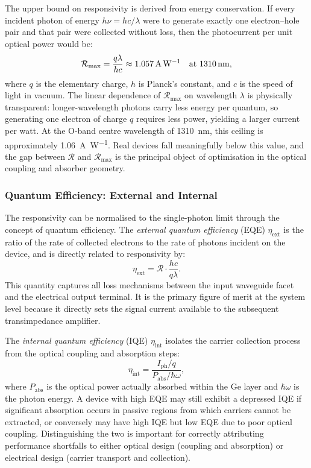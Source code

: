 The upper bound on responsivity is derived from energy conservation. If every
incident photon of energy $h\nu = hc/\lambda$ were to generate exactly one
electron–hole pair and that pair were collected without loss, then the
photocurrent per unit optical power would be:
\begin{equation}
    \mathcal{R}_{\max} = \frac{q\lambda}{hc}
    \approx \SI{1.057}{\ampere\per\watt}
    \quad\text{at \SI{1310}{\nano\metre}},
    \label{eq:rmax}
\end{equation}
where $q$ is the elementary charge, $h$ is Planck's constant, and $c$ is the
speed of light in vacuum. The linear dependence of $\mathcal{R}_{\max}$ on
wavelength $\lambda$ is physically transparent: longer-wavelength photons carry
less energy per quantum, so generating one electron of charge $q$ requires less
power, yielding a larger current per watt. At the O-band centre wavelength of
\SI{1310}{\nano\metre}, this ceiling is approximately \SI{1.06}{\ampere\per\watt}.
Real devices fall meaningfully below this value, and the gap between $\mathcal{R}$
and $\mathcal{R}_{\max}$ is the principal object of optimisation in the optical
coupling and absorber geometry.

\subsubsection{Quantum Efficiency: External and Internal}

The responsivity can be normalised to the single-photon limit through the concept
of quantum efficiency. The \emph{external quantum efficiency} (EQE) $\eta_{\mathrm{ext}}$
is the ratio of the rate of collected electrons to the rate of photons incident
on the device, and is directly related to responsivity by:
\begin{equation}
    \eta_{\mathrm{ext}}
    = \mathcal{R}\cdot\frac{hc}{q\lambda}.
    \label{eq:eqe}
\end{equation}
This quantity captures all loss mechanisms between the input waveguide facet and
the electrical output terminal. It is the primary figure of merit at the system
level because it directly sets the signal current available to the subsequent
transimpedance amplifier.

The \emph{internal quantum efficiency} (IQE) $\eta_{\mathrm{int}}$ isolates the
carrier collection process from the optical coupling and absorption steps:
\begin{equation}
    \eta_{\mathrm{int}}
    = \frac{I_{\mathrm{ph}}/q}{P_{\mathrm{abs}}/\hbar\omega},
    \label{eq:iqe}
\end{equation}
where $P_{\mathrm{abs}}$ is the optical power actually absorbed within the Ge
layer and $\hbar\omega$ is the photon energy. A device with high EQE may still
exhibit a depressed IQE if significant absorption occurs in passive regions from
which carriers cannot be extracted, or conversely may have high IQE but low EQE
due to poor optical coupling. Distinguishing the two is important for correctly
attributing performance shortfalls to either optical design (coupling and
absorption) or electrical design (carrier transport and collection).

